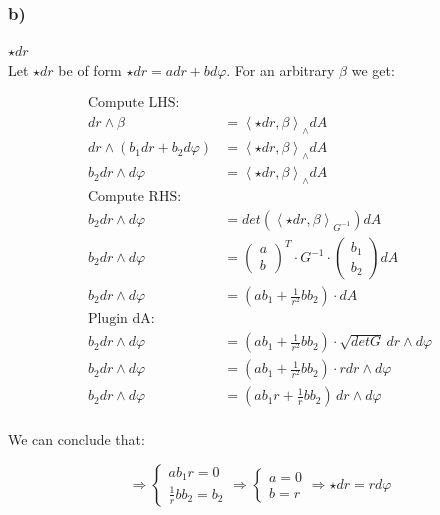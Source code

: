 \documentclass{article}
\begin{document}
\newpage
\subsubsection*{b)}
\begin{center}
	$\boxed{\star dr}$\\
	\vspace{1em}
	Let $\star dr$ be of form $\star dr = a dr + b d\varphi$. For an arbitrary $\beta$ we get:
\end{center}

\begin{align*}
	\text{Compute LHS:}\\
	dr \wedge \beta &= \left\langle \star dr, \beta \right\rangle_\wedge dA\\
	dr \wedge (b_1dr+b_2d\varphi) &= \left\langle \star dr, \beta \right\rangle_\wedge dA\\
	b_2 dr \wedge d\varphi &= \left\langle \star dr, \beta \right\rangle_\wedge dA\\
	\text{Compute RHS:}\\
	b_2 dr \wedge d\varphi &= det(\left\langle \star dr, \beta \right\rangle_{G^{-1}}) dA\\
	b_2 dr \wedge d\varphi &= \begin{pmatrix}
								a\\
								b	
							  \end{pmatrix}^T\cdot G^{-1}\cdot \begin{pmatrix}
								b_1\\
								b_2	
								\end{pmatrix}dA\\
	b_2 dr \wedge d\varphi &= (ab_1 + \frac{1}{r^2}bb_2) \cdot dA\\
	\text{Plugin dA:}\\
	b_2 dr \wedge d\varphi &= (ab_1 + \frac{1}{r^2}bb_2) \cdot \sqrt{det G} \, dr \wedge d\varphi\\
	b_2 dr \wedge d\varphi &= (ab_1 + \frac{1}{r^2}bb_2) \cdot r dr \wedge d\varphi\\
	b_2 dr \wedge d\varphi &= (ab_1r + \frac{1}{r}bb_2)\, dr \wedge d\varphi\\
\end{align*}
\begin{center}
	We can conclude that:
\end{center}
\begin{equation*}
	\Rightarrow \begin{cases}
		ab_1r = 0\\
		\frac{1}{r}bb_2 = b_2
	\end{cases} \Rightarrow \begin{cases}
		a = 0\\
		b = r
	\end{cases} \Rightarrow \boxed{\star dr = r d\varphi}
\end{equation*}
\end{document}

